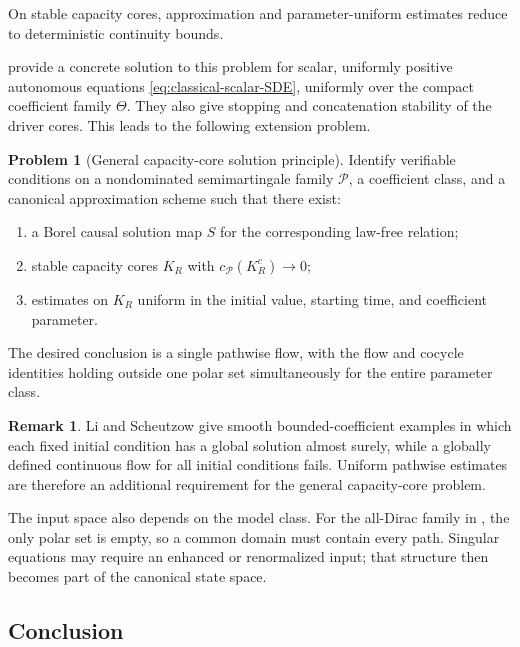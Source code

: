 \documentclass[11pt,reqno]{amsart}
\theoremstyle{plain}
\theoremstyle{definition}
\newtheorem{remark}[remark]{Remark}
\newtheorem{problem}[problem]{Problem}
\newcommand{\cP}{\mathcal P}
\begin{document}
On stable capacity cores, approximation and parameter-uniform estimates
reduce to deterministic continuity bounds.

 provide a
concrete solution to this problem for scalar, uniformly positive autonomous
equations
\eqref{eq:classical-scalar-SDE}, uniformly over the compact coefficient
family \(\Theta\).  They also give stopping and concatenation stability of
the driver cores.  This leads to the following extension problem.

\begin{problem}[General capacity-core solution principle]
\label{problem:capacity-core}
Identify verifiable conditions on a nondominated semimartingale family
\(\cP\), a coefficient class, and a canonical approximation scheme such that
there exist:
\begin{enumerate}[label=(\roman*),leftmargin=2.2em]
  \item a Borel causal solution map \(S\) for the corresponding law-free
  relation;
  \item stable capacity cores \(K_R\) with
  \(c_{\cP}(K_R^c)\to0\);
  \item estimates on \(K_R\) uniform in the initial value, starting time, and
  coefficient parameter.
\end{enumerate}
The desired conclusion is a single pathwise flow, with the flow and cocycle
identities holding outside one polar set simultaneously for the entire
parameter class.
\end{problem}

\begin{remark}
Li and Scheutzow \cite{LiScheutzow11} give smooth bounded-coefficient
examples in which each fixed initial condition has a global solution almost
surely, while a globally defined continuous flow for all initial conditions
fails.  Uniform pathwise estimates are therefore an additional requirement
for the general capacity-core problem.
\end{remark}

The input space also depends on the model class.  For the all-Dirac family in
\cite[Example 26]{DenisHuPeng11}, the only polar set is empty, so a common
domain must contain every path.  Singular equations may require an enhanced
or renormalized input; that structure then becomes part of the canonical
state space.

\subsection{Conclusion}
\end{document}
